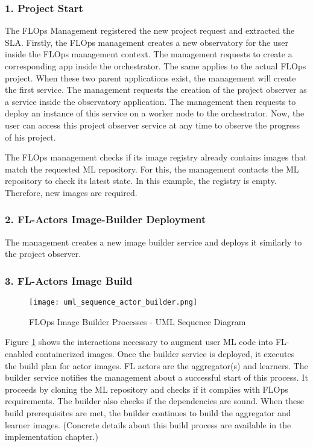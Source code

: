 \subsubsection{1. Project Start}
The FLOps Management registered the new project request and extracted the SLA.
Firstly, the FLOps management creates a new observatory for the user inside the FLOps management context.
The management requests to create a corresponding app inside the orchestrator.
The same applies to the actual FLOps project.
When these two parent applications exist, the management will create the first service.
The management requests the creation of the project observer as a service inside the observatory application.
The management then requests to deploy an instance of this service on a worker node to the orchestrator.
Now, the user can access this project observer service at any time to observe the progress of his project.

The FLOps management checks if its image registry already contains images that match the requested ML repository.
For this, the management contacts the ML repository to check its latest state.
In this example, the registry is empty.
Therefore, new images are required.

\subsubsection{2. FL-Actors Image-Builder Deployment}
The management creates a new image builder service and deploys it similarly to the project observer.

\subsubsection{3. FL-Actors Image Build}

\begin{figure}[h]
    \begin{adjustwidth}{-0.2\paperwidth}{-0.2\paperwidth}
        \centering
        \texttt{[image: uml\_sequence\_actor\_builder.png]}
        \caption{FLOps Image Builder Processes - UML Sequence Diagram}
        \label{fig:uml_sequence_builder}
    \end{adjustwidth}
\end{figure}
Figure \ref{fig:uml_sequence_builder} shows the interactions necessary to augment user ML code into FL-enabled containerized images.
Once the builder service is deployed, it executes the build plan for actor images.
FL actors are the aggregator(s) and learners.
The builder service notifies the management about a successful start of this process.
It proceeds by cloning the ML repository and checks if it complies with FLOps requirements.
The builder also checks if the dependencies are sound.
When these build prerequisites are met, the builder continues to build the aggregator and learner images.
(Concrete details about this build process are available in the implementation chapter.)

